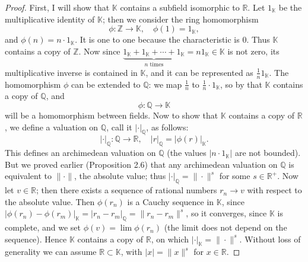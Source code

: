 \documentclass[11pt]{article}
\begin{document}
\begin{proof}
First, I will show that $\mathbb{K}$ contains a subfield isomorphic to $\mathbb{R}$. Let $1_{\mathbb{K}}$ be the multiplicative identity of $\mathbb{K}$; then we consider the ring homomorphism
\[
\phi : \mathbb{Z} \rightarrow \mathbb{K}, \quad \phi(1) = 1_{\mathbb{K}},
\]
and $\phi(n) = n\cdot 1_{\mathbb{K}}$. It is one to one because the characteristic is $0$. Thus $\mathbb{K}$ contains a copy of $\mathbb{Z}$. Now since $\underbrace{1_{\mathbb{K}} + 1_{\mathbb{K}} + \cdots + 1_{\mathbb{K}}}_{n \text{ times}} = n 1_{\mathbb{K}} \in \mathbb{K}$ is not zero, its multiplicative inverse is contained in $\mathbb{K}$, and it can be represented as $\frac1n 1_{\mathbb{K}}$. The homomorphism $\phi$ can be extended to $\mathbb{Q}$: we map $\frac1n$ to $\frac1n\cdot 1_{\mathbb{K}}$, so by that $\mathbb{K}$ contains a copy of $\mathbb{Q}$, and
\[
\phi : \mathbb{Q} \rightarrow \mathbb{K}
\]
will be a homomorphism between fields. Now to show that $\mathbb{K}$ contains a copy of $\mathbb{R}$, we define a valuation on $\mathbb{Q}$, call it $|\cdot|_{\mathbb{Q}}$, as follows:
\[
|\cdot|_{\mathbb{Q}} : \mathbb{Q} \rightarrow \mathbb{R}, \quad |r|_{\mathbb{Q}} = |\phi(r)|_{\mathbb{K}} .
\]
This defines an archimedean valuation on $\mathbb{Q}$ (the values $|n\cdot 1_{\mathbb{K}}|$ are not bounded). But we proved earlier (Proposition 2.6) that any archimedean valuation on $\mathbb{Q}$ is equivalent to $\|\cdot\|$, the absolute value; thus $|\cdot|_{\mathbb{Q}} = \|\cdot\|^s$ for some $s \in \mathbb{R}^+$. Now let $v \in \mathbb{R}$; then there exists a sequence of rational numbers $r_n \rightarrow v$ with respect to the absolute value. Then $\phi(r_n)$ is a Cauchy sequence in $\mathbb{K}$, since $|\phi(r_n) - \phi(r_m)|_{\mathbb{K}} = |r_n - r_m|_{\mathbb{Q}} = \|r_n - r_m\|^s$, so it converges, since $\mathbb{K}$ is complete, and we set $\phi(v) = \lim \phi(r_n)$ (the limit does not depend on the sequence). Hence $\mathbb{K}$ contains a copy of $\mathbb{R}$, on which $|\cdot|_{\mathbb{K}} = \|\cdot\|^s$. Without loss of generality we can assume $\mathbb{R} \subset \mathbb{K}$, with $|x| = \|x\|^s$ for $x \in \mathbb{R}$.


\end{proof}
\end{document}
